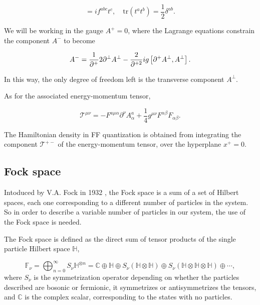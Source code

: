 \documentclass[11pt,a4paper,twoside,pdf]{article}
\numberwithin{equation}{section}
\begin{document}
\begin{equation}
    [t^a, t^b] = i f^{abc} t^c, \quad \text{tr}(t^a t^b) = \frac{1}{2} \delta^{ab}.
\end{equation}

We will be working in the gauge $A^+=0$, where the Lagrange equations constrain
the component $A^-$ to become 

\begin{equation}
    A^- = \frac{1}{\partial^+}2 \partial^\perp A^\perp - \frac{2}{\partial^{+2}} ig 
    \left[ \partial^+ A^\perp, A^\perp \right].
\end{equation}

In this way, the only degree of freedom left is the transverse component $A^\perp$.

As for the associated energy-momentum tensor,

\begin{equation}
    \mathcal{T}^{\mu\nu} = -F^{a\mu\alpha}\partial^\nu A^a_\alpha + 
    \frac{1}{4}g^{\mu\nu}F^{\alpha\beta} F_{\alpha\beta}.
\end{equation}

The Hamiltonian density in FF quantization is obtained from integrating the component
$\mathcal{T}^{+-}$ of the energy-momentum tensor, over the hyperplane $x^+=0$.




\subsection{Fock space}

Intoduced by V.A. Fock in 1932 \cite{1932ZPhy...75..622F}, the Fock space is a sum 
of a set of Hilbert spaces, each one corresponding to a different number of 
particles in the system. So in order to describe a variable number of particles in our 
system, the use of the Fock space is needed.

The Fock space is defined as the direct sum of tensor products of the single 
particle Hilbert space $\mathbb{H}$,

\begin{equation}
    \mathbb{F}_\nu = \bigoplus_{n=0}^{\infty} S_\nu \mathbb{H}^{\otimes n} = 
    \mathbb{C} \oplus \mathbb{H} \oplus S_\nu(\mathbb{H} \otimes \mathbb{H}) 
    \oplus S_\nu(\mathbb{H} \otimes \mathbb{H}\otimes \mathbb{H}) \oplus \cdots,
\end{equation}
where $S_\nu$ is the symmetrization operator depending on whether the particles described
are bosonic or fermionic, it symmetrizes or antisymmetrizes the tensors, and 
$\mathbb{C}$ is the complex scalar, corresponding to the states with no particles. 
\end{document}
